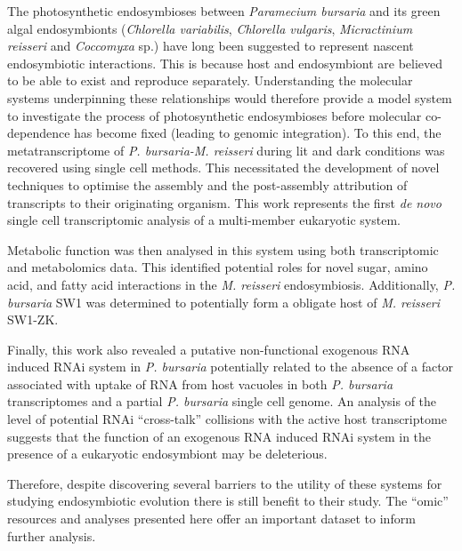 The photosynthetic endosymbioses between \textit{Paramecium bursaria} and its green algal endosymbionts 
(\textit{Chlorella variabilis}, \textit{Chlorella vulgaris}, \textit{Micractinium reisseri} and \textit{Coccomyxa} sp.) 
have long been suggested to represent nascent endosymbiotic interactions. This is because
host and endosymbiont are believed to be able to exist and reproduce separately. 
Understanding the molecular systems underpinning these relationships would therefore 
provide a model system to investigate the process of photosynthetic endosymbioses 
before molecular co-dependence has become fixed (leading to genomic integration).
To this end, the metatranscriptome of \textit{P. bursaria-M. reisseri} during 
lit and dark conditions was recovered using single cell methods. 
This necessitated the development of novel techniques to optimise the 
assembly and the post-assembly attribution of transcripts to their originating organism. 
This work represents the first \textit{de novo} single cell transcriptomic analysis of a multi-member eukaryotic system.  


Metabolic function was then analysed in this system using both transcriptomic and metabolomics data.
This identified potential roles for novel sugar, amino acid, and 
fatty acid interactions in the \textit{M. reisseri} endosymbiosis.
Additionally, \textit{P. bursaria} SW1 was determined to potentially form a obligate host of
\textit{M. reisseri} SW1-ZK.

 
Finally, this work also revealed a putative non-functional exogenous RNA induced 
RNAi system in \textit{P. bursaria} potentially related to the absence of a factor 
associated with uptake of RNA from host vacuoles in both \textit{P. bursaria}
transcriptomes and a partial \textit{P. bursaria} single cell genome.  
An analysis of the level of potential RNAi ``cross-talk'' 
collisions with the active host transcriptome suggests that the function of an 
exogenous RNA induced RNAi system in the presence of a eukaryotic endosymbiont may be deleterious.

 
Therefore, despite discovering several barriers to the utility of these systems for studying
endosymbiotic evolution there is still benefit to their study. The ``omic'' resources and analyses 
presented here offer an important dataset to inform further analysis.
